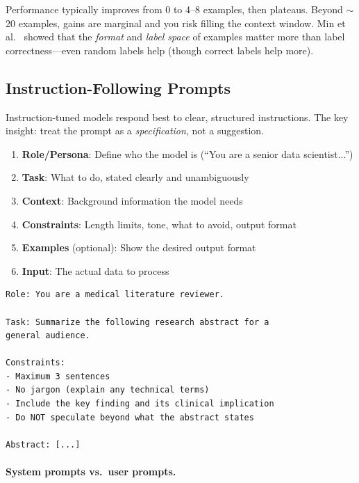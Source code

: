 Performance typically improves from 0 to 4--8 examples, then plateaus. Beyond $\sim$20 examples, gains are marginal and you risk filling the context window. Min et al.~\cite{min2022rethinking} showed that the \emph{format} and \emph{label space} of examples matter more than label correctness---even random labels help (though correct labels help more).

\subsection{Instruction-Following Prompts}
\label{instruction-following-prompts}

Instruction-tuned models respond best to clear, structured instructions. The key insight: treat the prompt as a \emph{specification}, not a suggestion.

\begin{keybox}
\begin{enumerate}
  \item \textbf{Role/Persona}: Define who the model is (``You are a senior data scientist...'')
  \item \textbf{Task}: What to do, stated clearly and unambiguously
  \item \textbf{Context}: Background information the model needs
  \item \textbf{Constraints}: Length limits, tone, what to avoid, output format
  \item \textbf{Examples} (optional): Show the desired output format
  \item \textbf{Input}: The actual data to process
\end{enumerate}
\end{keybox}

\begin{examplebox}
\begin{lstlisting}
Role: You are a medical literature reviewer.

Task: Summarize the following research abstract for a 
general audience.

Constraints:
- Maximum 3 sentences
- No jargon (explain any technical terms)
- Include the key finding and its clinical implication
- Do NOT speculate beyond what the abstract states

Abstract: [...]
\end{lstlisting}
\end{examplebox}

\paragraph{System prompts vs.~user prompts.}
\label{system-prompts-vs.-user-prompts.}

